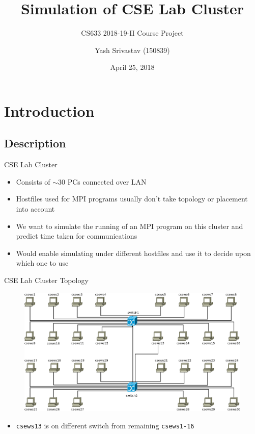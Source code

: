 \documentclass[pdf]{beamer}
\title{Simulation of CSE Lab Cluster}
\subtitle{CS633 2018-19-II Course Project}
\author{Yash Srivastav (150839)}
\date{April 25, 2018}
\begin{document}
\begin{frame}
  \titlepage
\end{frame}
\section{Introduction}
\subsection{Description}
\begin{frame}{CSE Lab Cluster}
  \begin{itemize}
    \item<1-> Consists of $\sim{} 30$ PCs connected over LAN
    \item<2-> Hostfiles used for MPI programs usually don't take topology or
      placement into account
    \item<3-> We want to simulate the running of an MPI program on this cluster
      and predict time taken for communications
    \item<4-> Would enable simulating under different hostfiles and use it to
      decide upon which one to use
  \end{itemize}
\end{frame}
\begin{frame}{CSE Lab Cluster Topology}
  \begin{figure}[ht]
    \begin{center}
      \includegraphics[width=\textwidth]{topology}
    \end{center}
  \end{figure}
  \begin{itemize}
    \item \texttt{csews13} is on different switch from remaining \texttt{csews1-16}
  \end{itemize}
\end{frame}
\end{document}
